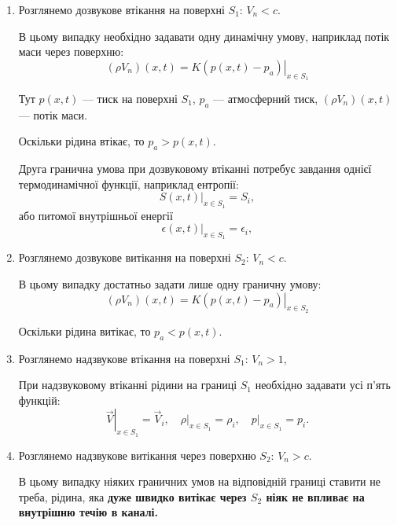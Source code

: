 \begin{enumerate}
	\item Розглянемо дозвукове втікання на поверхні $S_1$: $V_n < c$. \medskip   

	В цьому випадку необхідно задавати одну динамічну умову, наприклад потік маси через поверхню:
	\begin{equation}
		(\rho V_n )(x, t) = K \left. (p(x, t) - p_a) \right|_{x \in S_1}
	\end{equation}

	\begin{remark}
		Тут $p(x, t)$ --- тиск на поверхні $S_1$, $p_a$ --- атмосферний тиск, $(\rho V_n)(x, t)$ --- потік маси.
	\end{remark}

	\begin{remark}
		Оскільки рідина втікає, то $p_a > p(x, t)$.
	\end{remark}

	Друга гранична умова при дозвуковому втіканні потребує завдання однієї термодинамічної функції, наприклад ентропії:
	\begin{equation}
		\left. S(x, t) \right|_{x \in S_1} = S_i,
	\end{equation}
	або питомої внутрішньої енергії
	\begin{equation}
		\left. \epsilon(x, t) \right|_{x \in S_1} = \epsilon_i,
	\end{equation}

	\item Розглянемо дозвукове витікання на поверхні $S_2$: $V_n < c$. \medskip

	В цьому випадку достатньо задати лише одну граничну умову:
	\begin{equation}
		(\rho V_n )(x, t) = K \left. (p(x, t) - p_a) \right|_{x \in S_2}
	\end{equation}

	\begin{remark}
		Оскільки рідина витікає, то $p_a < p(x, t)$.
	\end{remark}

	\item Розглянемо надзвукове втікання на поверхні $S_1$: $V_n > 1$, \medskip

	При надзвуковому втіканні рідини на границі $S_1$ необхідно задавати усі п'ять функцій:
	\begin{equation}
		\left. \vec V \right|_{x \in S_1} = \vec V_i, \quad \left. \rho \right|_{x \in S_1} = \rho_i, \quad \left. p \right|_{x \in S_1} = p_i.
	\end{equation}

	\item Розглянемо надзвукове витікання через поверхню $S_2$: $V_n > c$. \medskip

	В цьому випадку ніяких граничних умов на відповідній границі ставити не треба, рідина, яка \bf{дуже швидко} витікає через $S_2$ ніяк не впливає на внутрішню течію в каналі.
\end{enumerate}

